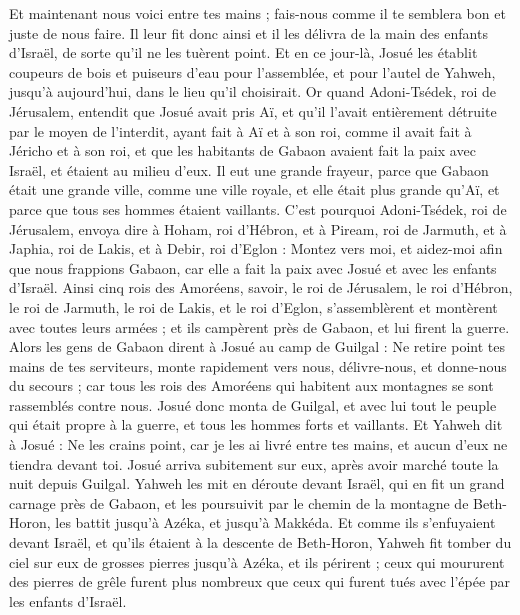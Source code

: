 \begin{multicols}{2}
Et maintenant nous voici entre tes mains ; fais-nous comme il te semblera bon et juste de nous faire.
Il leur fit donc ainsi et il les délivra de la main des enfants d'Israël, de sorte qu'il ne les tuèrent point.
Et en ce jour-là, Josué les établit coupeurs de bois et puiseurs d'eau pour l'assemblée, et pour l'autel de Yahweh, jusqu'à aujourd'hui, dans le lieu qu'il choisirait.
\VerseOne{}Or quand Adoni-Tsédek, roi de Jérusalem, entendit que Josué avait pris Aï, et qu'il l'avait entièrement détruite par le moyen de l'interdit, ayant fait à Aï et à son roi, comme il avait fait à Jéricho et à son roi, et que les habitants de Gabaon avaient fait la paix avec Israël, et étaient au milieu d'eux.
Il eut une grande frayeur, parce que Gabaon était une grande ville, comme une ville royale, et elle était plus grande qu'Aï, et parce que tous ses hommes étaient vaillants.
C'est pourquoi Adoni-Tsédek, roi de Jérusalem, envoya dire à Hoham, roi d'Hébron, et à Piream, roi de Jarmuth, et à Japhia, roi de Lakis, et à Debir, roi d'Eglon :
Montez vers moi, et aidez-moi afin que nous frappions Gabaon, car elle a fait la paix avec Josué et avec les enfants d'Israël.
Ainsi cinq rois des Amoréens, savoir, le roi de Jérusalem, le roi d'Hébron, le roi de Jarmuth, le roi de Lakis, et le roi d'Eglon, s'assemblèrent et montèrent avec toutes leurs armées ; et ils campèrent près de Gabaon, et lui firent la guerre.
Alors les gens de Gabaon dirent à Josué au camp de Guilgal : Ne retire point tes mains de tes serviteurs, monte rapidement vers nous, délivre-nous, et donne-nous du secours ; car tous les rois des Amoréens qui habitent aux montagnes se sont rassemblés contre nous.
Josué donc monta de Guilgal, et avec lui tout le peuple qui était propre à la guerre, et tous les hommes forts et vaillants.
Et Yahweh dit à Josué : Ne les crains point, car je les ai livré entre tes mains, et aucun d'eux ne tiendra devant toi.
Josué arriva subitement sur eux, après avoir marché toute la nuit depuis Guilgal.
Yahweh les mit en déroute devant Israël, qui en fit un grand carnage près de Gabaon, et les poursuivit par le chemin de la montagne de Beth-Horon, les battit jusqu'à Azéka, et jusqu'à Makkéda.
Et comme ils s'enfuyaient devant Israël, et qu'ils étaient à la descente de Beth-Horon, Yahweh fit tomber du ciel sur eux de grosses pierres jusqu'à Azéka, et ils périrent ; ceux qui moururent des pierres de grêle furent plus nombreux que ceux qui furent tués avec l'épée par les enfants d'Israël.

\end{multicols}
